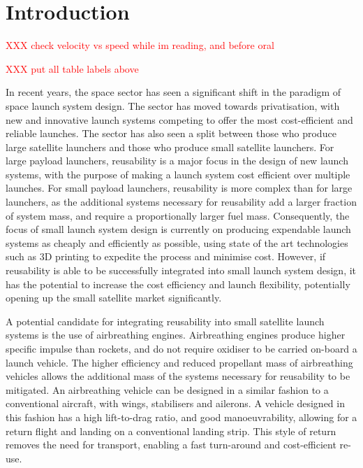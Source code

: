 
\cleardoublepage
\chapter{Introduction}


  
  	\textcolor{red}{ XXX check velocity vs speed while im reading, and before oral}
  	
  	
  	\textcolor{red}{ XXX put all table labels above}
  		
  	In recent years, the space sector has seen a significant shift in the paradigm of space launch system design. 
  	The sector has moved towards privatisation, with new and innovative launch systems competing to offer the most cost-efficient and reliable launches. 
  	The sector has also seen a split between those who produce large satellite launchers and those who produce small satellite launchers.
  	For large payload launchers, reusability is a major focus in the design of new launch systems, with the purpose of making a launch system cost efficient over multiple launches\cite{Faa2018}. 
  	For small payload launchers, reusability is more complex than for large launchers, as the additional systems necessary for reusability add a larger fraction of system mass, and require a proportionally larger fuel mass. 
  	Consequently, the focus of small launch system design is currently on producing expendable launch systems as cheaply and efficiently as possible, using state of the art technologies such as 3D printing to expedite the process and minimise cost\cite{Niederstrasser2015}.
  	However, if reusability is able to be successfully integrated into small launch system design, it has the potential to increase the cost efficiency and launch flexibility, potentially opening up the small satellite market significantly. 
  	
  	
  	
  	A potential candidate for integrating reusability into small satellite launch systems is the use of airbreathing engines\cite{Smart2009a,Ketsdever2010}.
Airbreathing engines produce higher specific impulse than rockets, and do not require oxidiser to be carried on-board a launch vehicle\cite{Smart2010}.  	 
  	The higher efficiency and reduced propellant mass of airbreathing vehicles allows the additional mass of the systems necessary for reusability to be mitigated\cite{Curran2003}. An airbreathing vehicle can be designed in a similar fashion to a conventional aircraft, with wings, stabilisers and ailerons\cite{Shaughnessy1990,Preller2017b}. A vehicle designed in this fashion has a high lift-to-drag ratio, and good manoeuvrability, allowing for a return flight and landing on a conventional landing strip\cite{Preller2017b}. This style of return removes the need for transport, enabling a fast turn-around and cost-efficient re-use. 
  	
